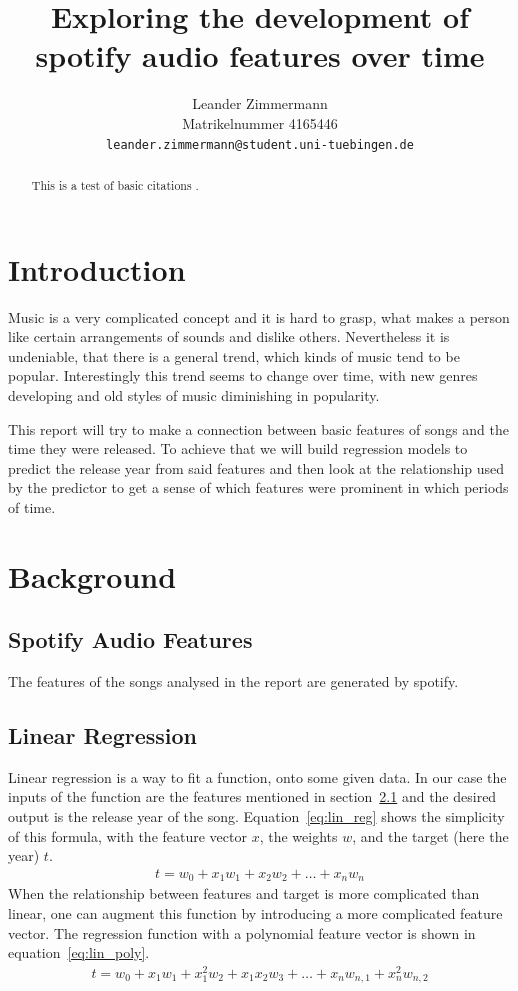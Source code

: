 \documentclass{article}
\title{Exploring the development of spotify audio features over time}
\author{%
  Leander Zimmermann\\
  Matrikelnummer 4165446\\
  \texttt{leander.zimmermann@student.uni-tuebingen.de} \\
}
\begin{document}
\maketitle

\begin{abstract}
  This is a test of basic citations \citet{dataset}.
\end{abstract}

\section{Introduction}

Music is a very complicated concept and it is hard to grasp, what makes a person like certain arrangements of sounds and dislike others. Nevertheless it is undeniable, that there is a general trend, which kinds of music tend to be popular. Interestingly this trend seems to change over time, with new genres developing and old styles of music diminishing in popularity.

This report will try to make a connection between basic features of songs and the time they were released. To achieve that we will build regression models to predict the release year from said features and then look at the relationship used by the predictor to get a sense of which features were prominent in which periods of time.

\section{Background}
\subsection{Spotify Audio Features}\label{sec:features}
The features of the songs analysed in the report are generated by spotify.
\citep{spotify_audio_features} 

\subsection{Linear Regression}\label{sec:lin_reg}
Linear regression is a way to fit a function, onto some given data. In our case the inputs of the function are the features mentioned in section~\ref{sec:features} and the desired output is the release year of the song.
Equation~\ref{eq:lin_reg} shows the simplicity of this formula, with the feature vector $x$, the weights $w$, and the target (here the year) $t$.
\begin{align}
  t = w_0 + x_1w_1 + x_2w_2 + \dots + x_nw_n \label{eq:lin_reg}
\end{align}
When the relationship between features and target is more complicated than linear, one can augment this function by introducing a more complicated feature vector. The regression function with a polynomial feature vector is shown in equation~\ref{eq:lin_poly}.
\begin{align}
  t = w_0 + x_1w_{1} + x_1^2w_{2} + x_1x_2w_{3} + \dots + x_nw_{n,1} + x_n^2w_{n,2} \label{eq:lin_poly}
\end{align}
\end{document}
